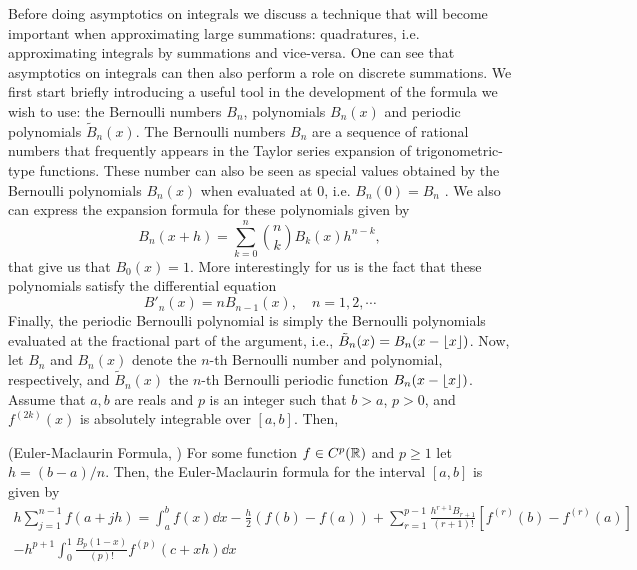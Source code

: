 Before doing asymptotics on integrals we discuss a technique that will become important when approximating large summations: quadratures, i.e. approximating integrals by summations and vice-versa. One can see that asymptotics on integrals can then also perform a role on discrete summations. We first start briefly introducing a useful tool in the development of the formula we wish to use: the Bernoulli numbers $B_n$, polynomials $B_n(x)$ and periodic polynomials $\tilde{B}_n(x)$. The Bernoulli numbers $B_n$ are a sequence of rational numbers that frequently appears in the Taylor series expansion of trigonometric-type functions. These number can also be seen as special values obtained by the Bernoulli polynomials $B_n(x)$ when evaluated at $0$, i.e. $B_n(0) = B_n$ . We also can express the expansion formula for these polynomials given by
\begin{equation}
	B_n(x + h) = \sum_{k=0}^{n} {n \choose k} B_{k}(x) h^{n-k},
\end{equation}
that give us that $B_0(x) = 1$. More interestingly for us is the fact that these polynomials satisfy the differential equation 
\begin{equation}	\label{Equation: Differential Bernoulli}
	B'_n(x) = n B_{n-1}(x), \quad n = 1,2,\cdots
\end{equation}
Finally, the periodic Bernoulli polynomial is simply the Bernoulli polynomials evaluated at the fractional part of the argument, i.e., $\tilde{B}_n(x) = B_n(x - \lfloor x\rfloor)$. Now, let $B_n$ and $B_n(x)$ denote the $n$-th Bernoulli number and polynomial, respectively, and $\tilde{B}_n(x)$ the $n$-th Bernoulli periodic function $B_n(x - \lfloor x\rfloor)$. Assume that $a, b$ are reals and $p$ is an integer such that $b > a$, $p > 0$, and $f^{(2k)}(x)$ is absolutely integrable over $[a,b]$. Then, 

\begin{teorema} \label{Theorem: Euler-Maclaurin}(Euler-Maclaurin Formula,  \cite{Trapezoidal-Maclaurin})
	For some function $f \in C^p(\mathbb{R})$ and $p \geq 1$ let $h = (b - a)/n$. Then, the Euler-Maclaurin formula for the interval $[a,b]$ is given by
	\begin{multline}
		h \sum_{j=1}^{n-1} f(a + j h) = \int_{a}^{b} f(x) \dd x - \frac{h}{2} (f(b) - f(a)) + \sum_{r = 1}^{p-1} \frac{h^{r+1} B_{r+1}}{(r+1)!} \left[ f^{(r)}(b) - f^{(r)}(a) \right] \\- h^{p+1} \int_0^1 \frac{B_{p}(1-x)}{(p)!} f^{(p)}(c+xh) \dd x
	\end{multline}
\end{teorema}

